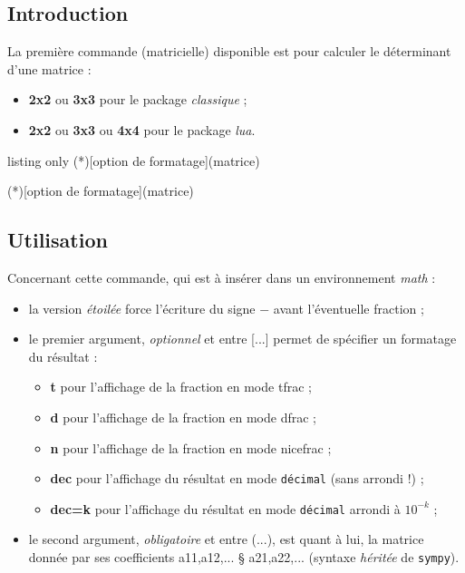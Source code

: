 \documentclass[a4paper,11pt]{article}
\newcommand\Cle[1]{{\bfseries\sffamily\textlangle #1\textrangle}}
\begin{document}
\subsection{Introduction}

\begin{cautionblock}
La première commande (matricielle) disponible est pour calculer le déterminant d'une matrice :

\begin{itemize}
	\item \textbf{2x2} ou \textbf{3x3} pour le package \textit{classique} ;
	\item \textbf{2x2} ou \textbf{3x3} ou \textbf{4x4} pour le package \textit{lua}.
\end{itemize}
\vspace*{-\baselineskip}\leavevmode
\end{cautionblock}

\begin{PresentationCode}{listing only}
\DetMatrice(*)[option de formatage](matrice)

\DetMatricePY(*)[option de formatage](matrice)
\end{PresentationCode}

\subsection{Utilisation}

\begin{tipblock}
Concernant cette commande, qui est à insérer dans un environnement \textit{math} :

\begin{itemize}
	\item la version \textit{étoilée} force l'écriture du signe \og $-$ \fg{} avant l'éventuelle fraction ;
	\item le premier argument, \textit{optionnel} et entre \textsf{[...]} permet de spécifier un formatage du résultat :
	\begin{itemize}
		\item \Cle{t} pour l'affichage de la fraction en mode \textsf{tfrac} ;
		\item \Cle{d} pour l'affichage de la fraction en mode \textsf{dfrac} ;
		\item \Cle{n} pour l'affichage de la fraction en mode \textsf{nicefrac} ;
		\item \Cle{dec} pour l'affichage du résultat en mode \texttt{décimal} (sans arrondi !) ;
		\item \Cle{dec=k} pour l'affichage du résultat en mode \texttt{décimal} arrondi à $10^{-k}$ ;
	\end{itemize}
	\item le second argument, \textit{obligatoire} et entre \textsf{(...)}, est quant à lui, la matrice donnée par ses coefficients \textsf{a11,a12,... § a21,a22,...} (syntaxe \textit{héritée} de \texttt{sympy}).
\end{itemize}
\vspace*{-\baselineskip}\leavevmode
\end{tipblock}
\end{document}
